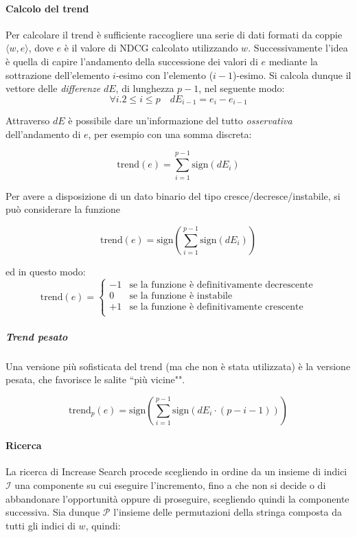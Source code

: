 \paragraph{Calcolo del trend}
Per calcolare il trend è sufficiente raccogliere una serie di dati formati
da coppie $\langle w, e\rangle$, dove $e$ è il valore di NDCG calcolato
utilizzando $w$. Successivamente l'idea è quella di capire
l'andamento della successione dei valori di $e$ mediante
la sottrazione dell'elemento $i$-esimo con l'elemento ($i-1$)-esimo.
Si calcola dunque il vettore delle \textit{differenze} $dE$, di lunghezza $p-1$, nel seguente modo:
$$
\forall{i.2 \leq i \leq p} \quad dE_{i-1} = e_{i} - e_{i-1}
$$

Attraverso $dE$ è possibile dare un'informazione del tutto
\textit{osservativa} dell'andamento di $e$, per esempio
con una somma discreta:

$$
\text{trend}(e) = \sum_{i=1}^{p-1} \text{sign}(dE_i)
$$

Per avere a disposizione di un dato binario del tipo cresce/decresce/instabile,
si può considerare la funzione

$$
\text{trend}(e) = \text{sign}\left(\sum_{i=1}^{p-1} \text{sign}(dE_i)\right)
$$

ed in questo modo:
$$
\text{trend}(e) =
\begin{cases}
-1 & \text{se la funzione è definitivamente decrescente} \\
0 & \text{se la funzione è instabile} \\
+1 & \text{se la funzione è definitivamente crescente} \\
\end{cases}
$$

\subparagraph{Trend pesato}
Una versione più sofisticata del trend (ma che non è stata utilizzata)
è la versione pesata, che favorisce le salite ``più vicine"".

$$
\text{trend}_p(e) = \text{sign}\left(\sum_{i=1}^{p-1} \text{sign}\left(dE_i \cdot (p-i-1)\right)\right)
$$


\paragraph{Ricerca}
La ricerca di Increase Search procede scegliendo in ordine da
un insieme di indici $\mathcal{I}$ una componente su cui eseguire
l'incremento, fino a che non si decide o di abbandonare
l'opportunità oppure di proseguire, scegliendo quindi la componente successiva.
Sia dunque $\mathcal{P}$ l'insieme delle permutazioni della stringa
composta da tutti gli indici di $w$, quindi:

